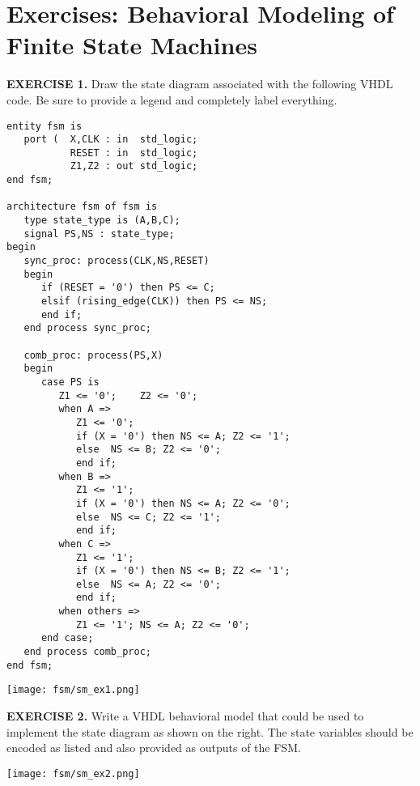 \section{Exercises: Behavioral Modeling of Finite State Machines}
\vspace{20pt}
\noindent
\begin{minipage}{1\textwidth}
\textbf{EXERCISE 1.}
Draw the state diagram associated with the following VHDL code. Be sure to provide a legend and completely label everything.
\end{minipage}
\begin{minipage}{0.66\textwidth}
\vspace{10px}
\begin{lstlisting}
entity fsm is 
   port (  X,CLK : in  std_logic; 
           RESET : in  std_logic; 
           Z1,Z2 : out std_logic;  
end fsm;

architecture fsm of fsm is
   type state_type is (A,B,C);
   signal PS,NS : state_type;
begin
   sync_proc: process(CLK,NS,RESET)
   begin
      if (RESET = '0') then PS <= C; 
      elsif (rising_edge(CLK)) then PS <= NS; 
      end if; 
   end process sync_proc; 

   comb_proc: process(PS,X)
   begin
      case PS is 
         Z1 <= '0';    Z2 <= '0'; 
         when A =>    
            Z1 <= '0';  
            if (X = '0') then NS <= A; Z2 <= '1';   
            else  NS <= B; Z2 <= '0';
            end if; 
         when B =>    
            Z1 <= '1';  
            if (X = '0') then NS <= A; Z2 <= '0';  
            else  NS <= C; Z2 <= '1'; 
            end if; 
         when C =>    
            Z1 <= '1';  
            if (X = '0') then NS <= B; Z2 <= '1'; 
            else  NS <= A; Z2 <= '0'; 
            end if; 
         when others =>    
            Z1 <= '1'; NS <= A; Z2 <= '0'; 
      end case; 
   end process comb_proc; 
end fsm;
\end{lstlisting}
\end{minipage}
\begin{minipage}{0.29\textwidth}
\texttt{[image: fsm/sm\_ex1.png]}
\vspace{250px}
\end{minipage}

\vspace{20pt}
\noindent
\begin{minipage}[t]{0.5\textwidth}
\textbf{EXERCISE 2.}
Write a VHDL behavioral model that could be used to implement the state diagram as shown on the right. The state variables should be encoded as listed and also provided as outputs of the FSM.
\end{minipage}
\begin{minipage}[t]{0.47\textwidth}
\vspace{0pt}\raggedright
\centering
\texttt{[image: fsm/sm\_ex2.png]}
\end{minipage}

